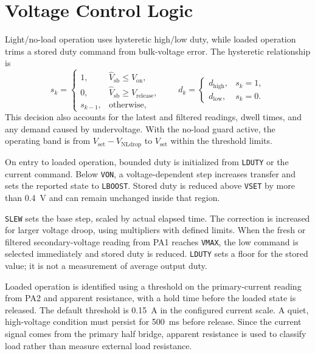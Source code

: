 \section{Voltage Control Logic}
\label{sec:ctrl-law}

Light/no-load operation uses hysteretic high/low duty, while loaded operation trims a stored duty command from bulk-voltage error. The hysteretic relationship is
\begin{equation}
 s_k=
 \begin{cases}
  1, & \widehat V_{\mathrm{sb}}\leq V_{\mathrm{on}},\\
  0, & \widehat V_{\mathrm{sb}}\geq V_{\mathrm{release}},\\
  s_{k-1}, & \text{otherwise},
 \end{cases}
 \qquad
 d_k=
 \begin{cases}
  d_{\mathrm{high}}, & s_k=1,\\
  d_{\mathrm{low}}, & s_k=0.
 \end{cases}
 \label{eq:ctrl-hysteresis}
\end{equation}
This decision also accounts for the latest and filtered readings, dwell times, and any demand caused by undervoltage. With the no-load guard active, the operating band is from \(V_{\mathrm{set}}-V_{\mathrm{NLdrop}}\) to \(V_{\mathrm{set}}\) within the threshold limits.

On entry to loaded operation, bounded duty is initialized from \texttt{LDUTY} or the current command. Below \texttt{VON}, a voltage-dependent step increases transfer and sets the reported state to \texttt{LBOOST}. Stored duty is reduced above \texttt{VSET} by more than \SI{0.4}{\volt} and can remain unchanged inside that region.

\texttt{SLEW} sets the base step, scaled by actual elapsed time. The correction is increased for larger voltage droop, using multipliers with defined limits. When the fresh or filtered secondary-voltage reading from PA1 reaches \texttt{VMAX}, the low command is selected immediately and stored duty is reduced. \texttt{LDUTY} sets a floor for the stored value; it is not a measurement of average output duty.

Loaded operation is identified using a threshold on the primary-current reading from PA2 and apparent resistance, with a hold time before the loaded state is released. The default threshold is \SI{0.15}{\ampere} in the configured current scale. A quiet, high-voltage condition must persist for \SI{500}{\milli\second} before release. Since the current signal comes from the primary half bridge, apparent resistance is used to classify load rather than measure external load resistance.

